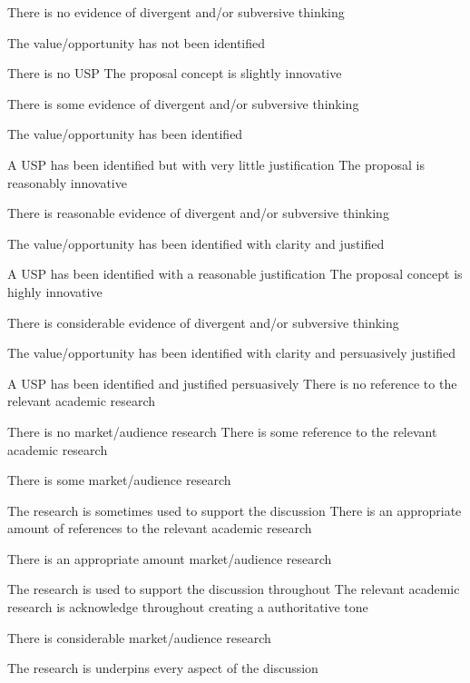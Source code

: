 \begin{markingrubric}
            \par		There is no evidence of divergent and/or subversive thinking 
            \par        The value/opportunity has not been identified 
            \par        There is no USP
        \grade   	The proposal concept is slightly innovative
            \par	There is some evidence of divergent and/or subversive thinking 
            \par    The value/opportunity has been identified 
            \par    A USP has been identified but with very little justification
        \grade   	The proposal is reasonably innovative
            \par	There is reasonable evidence of divergent and/or subversive thinking 
            \par    The value/opportunity has been identified with clarity and justified
            \par    A USP has been identified with a reasonable justification
        \grade   	The proposal concept is highly innovative
            \par	There is considerable evidence of divergent and/or subversive thinking 
            \par    The value/opportunity has been identified with clarity and persuasively justified  
            \par    A USP has been identified and justified persuasively
        \grade\fail 	There is no reference to the relevant academic research
            \par 		There is no market/audience research
        \grade 		There is some reference to the relevant academic research
            \par 		There is some market/audience research
            \par        The research is sometimes used to support the discussion
        \grade 		There is an appropriate amount of references to the relevant academic research
            \par 		There is an appropriate amount market/audience research
            \par        The research is used to support the discussion throughout
        \grade 		The relevant academic research is acknowledge throughout creating a authoritative tone 
            \par 		There is considerable market/audience research
            \par        The research is underpins every aspect of the discussion


\end{markingrubric}
